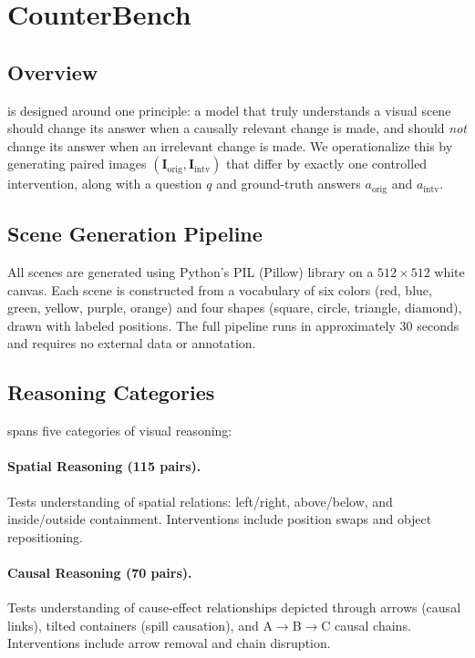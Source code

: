 \section{CounterBench}
\label{sec:method}

\subsection{Overview}

\method is designed around one principle: a model that truly understands a visual scene should change its answer when a causally relevant change is made, and should \emph{not} change its answer when an irrelevant change is made. We operationalize this by generating paired images $(\mathbf{I}_\text{orig}, \mathbf{I}_\text{intv})$ that differ by exactly one controlled intervention, along with a question $q$ and ground-truth answers $a_\text{orig}$ and $a_\text{intv}$.

\subsection{Scene Generation Pipeline}

All scenes are generated using Python's PIL (Pillow) library on a $512 \times 512$ white canvas. Each scene is constructed from a vocabulary of six colors (red, blue, green, yellow, purple, orange) and four shapes (square, circle, triangle, diamond), drawn with labeled positions. The full pipeline runs in approximately 30 seconds and requires no external data or annotation.

\subsection{Reasoning Categories}
\label{sec:categories}

\method spans five categories of visual reasoning:

\paragraph{Spatial Reasoning (115 pairs).} Tests understanding of spatial relations: left/right, above/below, and inside/outside containment. Interventions include position swaps and object repositioning.

\paragraph{Causal Reasoning (70 pairs).} Tests understanding of cause-effect relationships depicted through arrows (causal links), tilted containers (spill causation), and A$\to$B$\to$C causal chains. Interventions include arrow removal and chain disruption.

